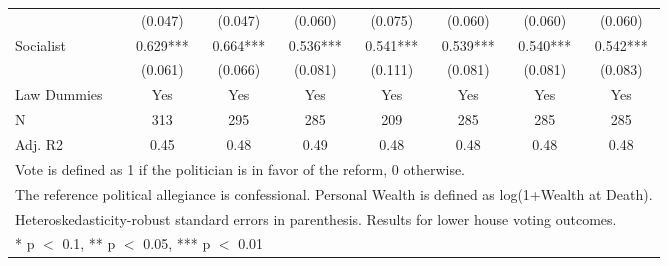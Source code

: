 \begin{table}
\begin{tabular}[t]{lccccccc}
 & (\num{0.047}) & (\num{0.047}) & (\num{0.060}) & (\num{0.075}) & (\num{0.060}) & (\num{0.060}) & (\num{0.060})\\
Socialist & \num{0.629}*** & \num{0.664}*** & \num{0.536}*** & \num{0.541}*** & \num{0.539}*** & \num{0.540}*** & \num{0.542}***\\
 & (\num{0.061}) & (\num{0.066}) & (\num{0.081}) & (\num{0.111}) & (\num{0.081}) & (\num{0.081}) & (\num{0.083})\\
\midrule
Law Dummies & Yes & Yes & Yes & Yes & Yes & Yes & Yes\\
N & \num{313} & \num{295} & \num{285} & \num{209} & \num{285} & \num{285} & \num{285}\\
Adj. R2 & \num{0.45} & \num{0.48} & \num{0.49} & \num{0.48} & \num{0.48} & \num{0.48} & \num{0.48}\\
\bottomrule
\multicolumn{8}{l}{\rule{0pt}{1em}Vote is defined as 1 if the politician is in favor of the reform, 0 otherwise.}\\
\multicolumn{8}{l}{\rule{0pt}{1em}The reference political allegiance is confessional. Personal Wealth is defined as log(1+Wealth at Death).}\\
\multicolumn{8}{l}{\rule{0pt}{1em}Heteroskedasticity-robust standard errors in parenthesis. Results for lower house voting outcomes.}\\
\multicolumn{8}{l}{\rule{0pt}{1em}* p $<$ 0.1, ** p $<$ 0.05, *** p $<$ 0.01}\\
\end{tabular}
\end{table}
